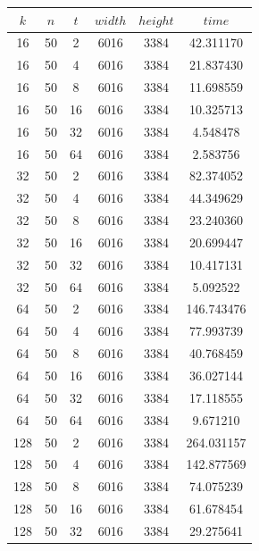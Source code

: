 \documentclass[11pt]{article}
\begin{document}
\begin{table}[H]
    \centering
    \label{dat:cpup}
    \begin{tabular}{c|c|c|c|c|c}
        $k$ & $n$ & $t$ & $width$ & $height$ & $time$     \\
        \hline
        16  & 50  & 2   & 6016    & 3384     & 42.311170  \\
        16  & 50  & 4   & 6016    & 3384     & 21.837430  \\
        16  & 50  & 8   & 6016    & 3384     & 11.698559  \\
        16  & 50  & 16  & 6016    & 3384     & 10.325713  \\
        16  & 50  & 32  & 6016    & 3384     & 4.548478   \\
        16  & 50  & 64  & 6016    & 3384     & 2.583756   \\
        32  & 50  & 2   & 6016    & 3384     & 82.374052  \\
        32  & 50  & 4   & 6016    & 3384     & 44.349629  \\
        32  & 50  & 8   & 6016    & 3384     & 23.240360  \\
        32  & 50  & 16  & 6016    & 3384     & 20.699447  \\
        32  & 50  & 32  & 6016    & 3384     & 10.417131  \\
        32  & 50  & 64  & 6016    & 3384     & 5.092522   \\
        64  & 50  & 2   & 6016    & 3384     & 146.743476 \\
        64  & 50  & 4   & 6016    & 3384     & 77.993739  \\
        64  & 50  & 8   & 6016    & 3384     & 40.768459  \\
        64  & 50  & 16  & 6016    & 3384     & 36.027144  \\
        64  & 50  & 32  & 6016    & 3384     & 17.118555  \\
        64  & 50  & 64  & 6016    & 3384     & 9.671210   \\
        128 & 50  & 2   & 6016    & 3384     & 264.031157 \\
        128 & 50  & 4   & 6016    & 3384     & 142.877569 \\
        128 & 50  & 8   & 6016    & 3384     & 74.075239  \\
        128 & 50  & 16  & 6016    & 3384     & 61.678454  \\
        128 & 50  & 32  & 6016    & 3384     & 29.275641  \\

\end{tabular}
\end{table}
\end{document}

